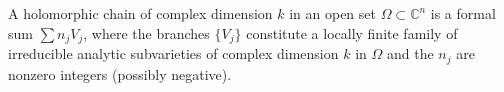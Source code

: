 
A holomorphic chain of complex dimension $k$ in an open set $\Omega \subset \mathbb{C}^n$ is a formal sum $\sum n_j V_j$, where the branches $\{V_j\}$ constitute a locally finite family of irreducible analytic subvarieties of complex dimension $k$ in $\Omega$ and the $n_j$ are nonzero integers (possibly negative).
